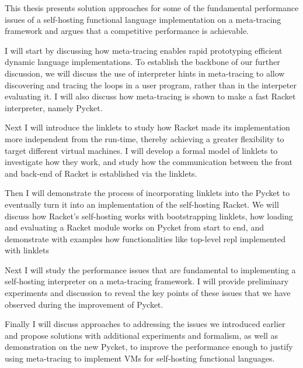 This thesis presents solution approaches for some of the fundamental
performance issues of a self-hosting functional language
implementation on a meta-tracing framework and argues that a
competitive performance is achievable.

I will start by discussing how meta-tracing enables rapid prototyping
efficient dynamic language implementations. To establish the backbone
of our further discussion, we will discuss the use of interpreter
hints in meta-tracing to allow discovering and tracing the loops in a
user program, rather than in the interpeter evaluating it. I will also
discuss how meta-tracing is shown to make a fast Racket interpreter,
namely Pycket.

Next I will introduce the linklets to study how Racket made its
implementation more independent from the run-time, thereby achieving a
greater flexibility to target different virtual machines. I will
develop a formal model of linklets to investigate how they work, and
study how the communication between the front and back-end of Racket
is established via the linklets.

Then I will demonstrate the process of incorporating linklets into the
Pycket to eventually turn it into an implementation of the
self-hosting Racket. We will discuss how Racket's self-hosting works
with bootstrapping linklets, how loading and evaluating a Racket
module works on Pycket from start to end, and demonstrate with
examples how functionalities like top-level repl implemented with
linklets

Next I will study the performance issues that are fundamental to
implementing a self-hosting interpreter on a meta-tracing framework. I
will provide preliminary experiments and discussion to reveal the key
points of these issues that we have observed during the improvement of
Pycket.

Finally I will discuss approaches to addressing the issues we
introduced earlier and propose solutions with additional experiments
and formalism, as well as demonstration on the new Pycket, to improve
the performance enough to justify using meta-tracing to implement VMs
for self-hosting functional languages.
